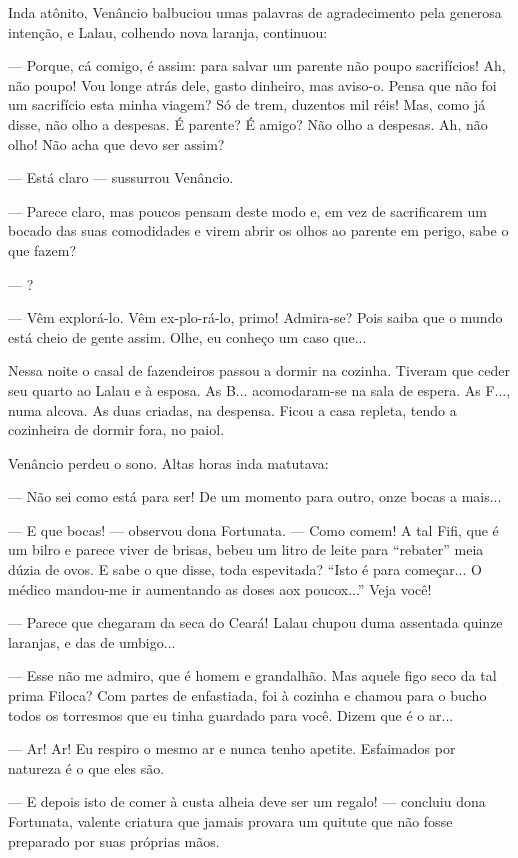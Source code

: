 Inda atônito, Venâncio balbuciou umas palavras de agradecimento pela
generosa intenção, e Lalau, colhendo nova laranja, continuou:

--- Porque, cá comigo, é assim: para salvar um parente não poupo
sacrifícios! Ah, não poupo! Vou longe atrás dele, gasto dinheiro, mas
aviso-o. Pensa que não foi um sacrifício esta minha viagem? Só de trem,
duzentos mil réis! Mas, como já disse, não olho a despesas. É parente? É
amigo? Não olho a despesas. Ah, não olho! Não acha que devo ser assim?

--- Está claro --- sussurrou Venâncio.

--- Parece claro, mas poucos pensam deste modo e, em vez de sacrificarem
um bocado das suas comodidades e virem abrir os olhos ao parente em
perigo, sabe o que fazem?

--- ?

--- Vêm explorá-lo. Vêm ex-plo-rá-lo, primo! Admira-se? Pois saiba que o
mundo está cheio de gente assim. Olhe, eu conheço um caso que...

Nessa noite o casal de fazendeiros passou a dormir na cozinha. Tiveram
que ceder seu quarto ao Lalau e à esposa. As B... acomodaram-se na sala
de espera. As F..., numa alcova. As duas criadas, na despensa. Ficou a
casa repleta, tendo a cozinheira de dormir fora, no paiol.

Venâncio perdeu o sono. Altas horas inda matutava:

--- Não sei como está para ser! De um momento para outro, onze bocas a
mais...

--- E que bocas! --- observou dona Fortunata. --- Como comem! A tal
Fifi, que é um bilro e parece viver de brisas, bebeu um litro de leite
para ``rebater'' meia dúzia de ovos. E sabe o que disse, toda
espevitada? ``Isto é para começar... O médico mandou-me ir aumentando as
doses aox poucox...'' Veja você!

--- Parece que chegaram da seca do Ceará! Lalau chupou duma assentada
quinze laranjas, e das de umbigo...

--- Esse não me admiro, que é homem e grandalhão. Mas aquele figo seco
da tal prima Filoca? Com partes de enfastiada, foi à cozinha e chamou
para o bucho todos os torresmos que eu tinha guardado para você. Dizem
que é o ar...

--- Ar! Ar! Eu respiro o mesmo ar e nunca tenho apetite. Esfaimados por
natureza é o que eles são.

--- E depois isto de comer à custa alheia deve ser um regalo! ---
concluiu dona Fortunata, valente criatura que jamais provara um quitute
que não fosse preparado por suas próprias mãos.

